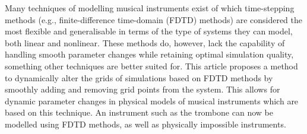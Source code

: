 Many techniques of modelling musical instruments exist of which time-stepping methods (e.g., finite-difference time-domain (FDTD) methods) are considered the most flexible and generalisable in terms of the type of systems they can model, both linear and nonlinear. These methods do, however, lack the capability of handling smooth parameter changes while retaining optimal simulation quality, something other techniques are better suited for. This article proposes a method to dynamically alter the grids of simulations based on FDTD methods by smoothly adding and removing grid points from the system. This allows for dynamic parameter changes in physical models of musical instruments which are based on this technique. An instrument such as the trombone can now be modelled using FDTD methods, as well as physically impossible instruments. %
 